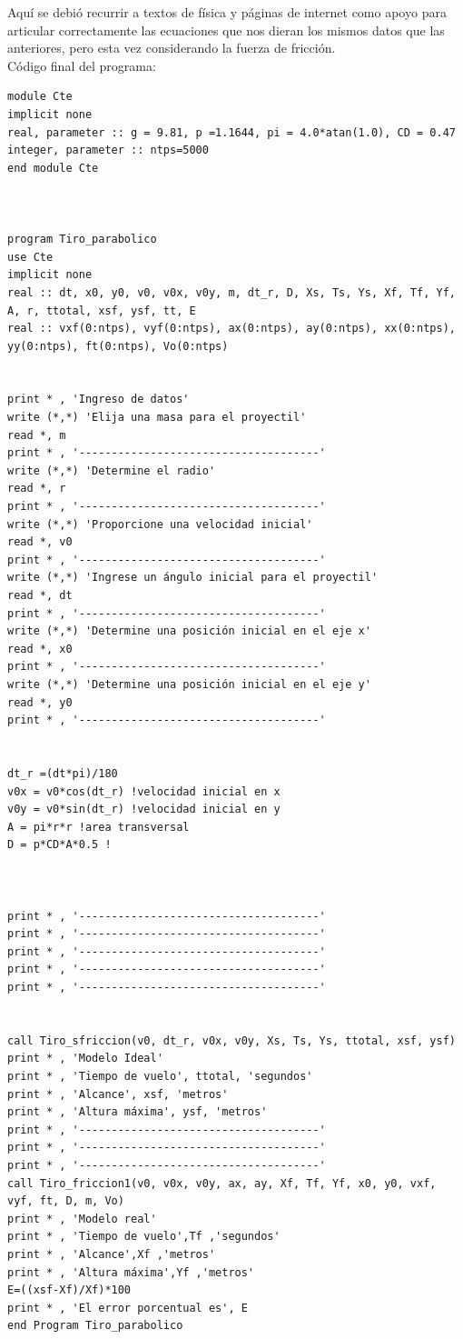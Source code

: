 \documentclass[12pt]{article}
\begin{document}
  Aquí se debió recurrir a textos de física y páginas de internet como apoyo para articular correctamente las ecuaciones que nos dieran los mismos datos que las anteriores, pero esta vez considerando la fuerza de fricción.\\
  
  Código final del programa:
  \begin{verbatim}
module Cte
implicit none 
real, parameter :: g = 9.81, p =1.1644, pi = 4.0*atan(1.0), CD = 0.47
integer, parameter :: ntps=5000
end module Cte



program Tiro_parabolico
use Cte
implicit none 
real :: dt, x0, y0, v0, v0x, v0y, m, dt_r, D, Xs, Ts, Ys, Xf, Tf, Yf, A, r, ttotal, xsf, ysf, tt, E
real :: vxf(0:ntps), vyf(0:ntps), ax(0:ntps), ay(0:ntps), xx(0:ntps), yy(0:ntps), ft(0:ntps), Vo(0:ntps)


print * , 'Ingreso de datos'
write (*,*) 'Elija una masa para el proyectil'
read *, m
print * , '-------------------------------------'
write (*,*) 'Determine el radio'
read *, r
print * , '-------------------------------------'
write (*,*) 'Proporcione una velocidad inicial'
read *, v0
print * , '-------------------------------------'
write (*,*) 'Ingrese un ángulo inicial para el proyectil'
read *, dt
print * , '-------------------------------------'
write (*,*) 'Determine una posición inicial en el eje x'
read *, x0
print * , '-------------------------------------'
write (*,*) 'Determine una posición inicial en el eje y'
read *, y0
print * , '-------------------------------------'


dt_r =(dt*pi)/180
v0x = v0*cos(dt_r) !velocidad inicial en x
v0y = v0*sin(dt_r) !velocidad inicial en y
A = pi*r*r !area transversal 
D = p*CD*A*0.5 !

 

print * , '-------------------------------------'
print * , '-------------------------------------'
print * , '-------------------------------------'
print * , '-------------------------------------'
print * , '-------------------------------------'


call Tiro_sfriccion(v0, dt_r, v0x, v0y, Xs, Ts, Ys, ttotal, xsf, ysf)
print * , 'Modelo Ideal'
print * , 'Tiempo de vuelo', ttotal, 'segundos'
print * , 'Alcance', xsf, 'metros'
print * , 'Altura máxima', ysf, 'metros'
print * , '-------------------------------------'
print * , '-------------------------------------'
print * , '-------------------------------------'
call Tiro_friccion1(v0, v0x, v0y, ax, ay, Xf, Tf, Yf, x0, y0, vxf, vyf, ft, D, m, Vo)
print * , 'Modelo real'
print * , 'Tiempo de vuelo',Tf ,'segundos'
print * , 'Alcance',Xf ,'metros'
print * , 'Altura máxima',Yf ,'metros'
E=((xsf-Xf)/Xf)*100
print * , 'El error porcentual es', E
end Program Tiro_parabolico




\end{verbatim}
\end{document}
